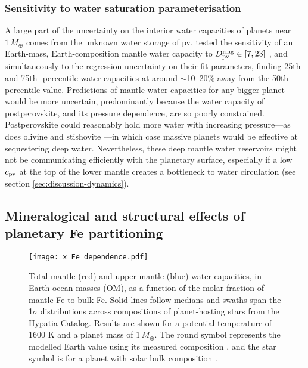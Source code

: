 \subsubsection{Sensitivity to water saturation parameterisation}\label{sec:results_sensitivity}
A large part of the uncertainty on the interior water capacities of planets near $1\,M_\oplus$ comes from the unknown water storage of pv. \citet{dong_constraining_2021} tested the sensitivity of an Earth-mass, Earth-composition mantle water capacity to  $D^{\rm ring}_{\rm pv} \in [7, 23]$ \citep{inoue_water_2010}, and simultaneously to the regression uncertainty on their fit parameters, finding 25th- and 75th- percentile water capacities at around $\sim$10--20\% away from the 50th percentile value. Predictions of mantle water capacities for any bigger planet would be more uncertain, predominantly because the water capacity of postperovskite, and its pressure dependence, are so poorly constrained. Postperovskite could reasonably hold more water with increasing pressure---as does olivine and stishovite \citep{panero_hydrogen_2004, dong_constraining_2021}---in which case massive planets would be effective at sequestering deep water. Nevertheless, these deep mantle water reservoirs might not be communicating efficiently with the planetary surface, especially if a low $c_{\rm pv}$ at the top of the lower mantle creates a bottleneck to water circulation (see section \ref{sec:discussion-dynamics}).



\subsection{Mineralogical and structural effects of planetary Fe partitioning}\label{sec:results_fe}



\begin{figure}
    \centering
    \texttt{[image: x\_Fe\_dependence.pdf]}
    \caption[The dependence of mantle water storage capacity on the extent of core formation.]{Total mantle (red) and upper mantle (blue) water capacities, in Earth ocean masses (OM), as a function of the molar fraction of mantle Fe to bulk Fe. Solid lines follow medians and swaths span the 1$\sigma$ distributions across compositions of planet-hosting stars from the Hypatia Catalog. Results are shown for a potential temperature of 1600 K and a planet mass of $1\,M_\oplus$. The round symbol represents the modelled Earth value using its measured composition \citep{mcdonough_composition_1995}, and the star symbol is for a planet with solar bulk composition \citep{lodders_abundances_2009}.}
    \label{fig:x_Fe_dependence}
\end{figure}




